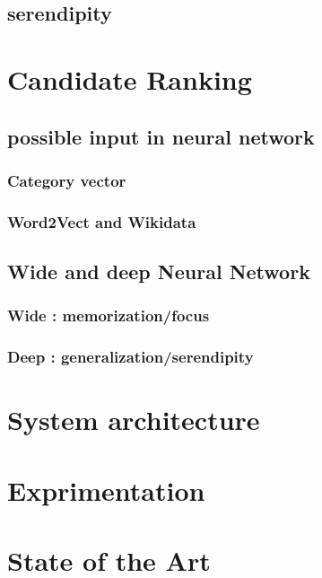 \documentclass[12pt]{article}
\theoremstyle{plain}
\theoremstyle{definition}
\theoremstyle{remark}
\begin{document}
\subsection{serendipity}



\section{Candidate Ranking}

\subsection{possible input in neural network}
\subsubsection{Category vector}
\subsubsection{Word2Vect and Wikidata}

\subsection{Wide and deep Neural Network}
\subsubsection{Wide : memorization/focus}
\subsubsection{Deep : generalization/serendipity}

\section{System architecture}


\section{Exprimentation}


\section{State of the Art}






\end{document}
